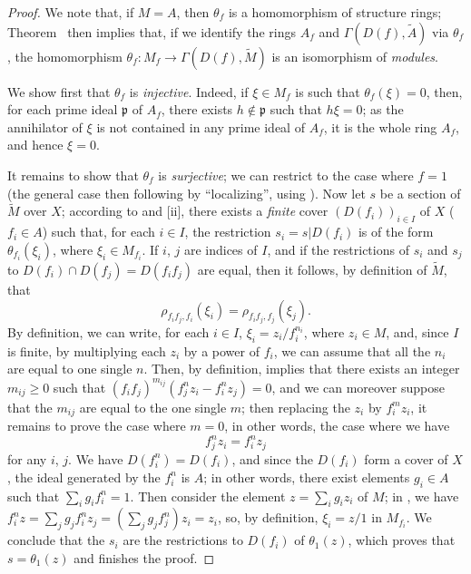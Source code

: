 \begin{proof}
We note that, if $M=A$, then $\theta_f$ is a homomorphism of structure rings;
Theorem~ then implies that, if we identify the rings $A_f$ and $\Gamma(D(f),\widetilde{A})$ via $\theta_f$, the homomorphism $\theta_f:M_f\to\Gamma(D(f),\widetilde{M})$ is an isomorphism of \emph{modules}.

We show first that $\theta_f$ is \emph{injective}.
Indeed, if $\xi\in M_f$ is such that $\theta_f(\xi)=0$, then, for each prime ideal $\mathfrak{p}$ of $A_f$, there exists $h\not\in\mathfrak{p}$ such that $h\xi=0$;
as the annihilator of $\xi$ is not contained in any prime ideal of $A_f$, it is the whole ring $A_f$, and hence $\xi=0$.

It remains to show that $\theta_f$ is \emph{surjective};
we can restrict to the case where $f=1$ (the general case then following by ``localizing'', using ).
Now let $s$ be a section of $\widetilde{M}$ over $X$;
according to  and [ii], there exists a \emph{finite} cover $(D(f_i))_{i\in I}$ of $X$ ($f_i\in A$) such that, for each $i\in I$, the restriction $s_i=s|D(f_i)$ is of the form $\theta_{f_i}(\xi_i)$, where $\xi_i\in M_{f_i}$.
If $i$, $j$ are indices of $I$, and if the restrictions of $s_i$ and $s_j$ to $D(f_i)\cap D(f_j)=D(f_i f_j)$ are equal, then it follows, by definition of $\widetilde{M}$, that
\[
  \label{I.1.3.7.1}
  \rho_{f_i f_j,f_i}(\xi_i)=\rho_{f_i f_j,f_j}(\xi_j).
  \tag{1.3.7.1}
\]
By definition, we can write, for each $i\in I$, $\xi_i=z_i/f_i^{n_i}$, where $z_i\in M$, and, since $I$ is finite, by multiplying each $z_i$ by a power of $f_i$, we can assume that all the $n_i$ are equal to one single $n$.
Then, by definition,  implies that there exists an integer $m_{ij}\geq 0$ such that $(f_i f_j)^{m_{ij}}(f_j^n z_i-f_i^n z_j)=0$, and we can moreover suppose that the $m_{ij}$ are equal to the one single $m$;
then replacing the $z_i$ by $f_i^m z_i$, it remains to prove the case where $m=0$, in other words, the case where we have
\[
  \label{I.1.3.7.2}
  f_j^n z_i=f_i^n z_j
  \tag{1.3.7.2}
\]
for any $i$, $j$.
We have $D(f_i^n)=D(f_i)$, and since the $D(f_i)$ form a cover of $X$, the ideal generated by the $f_i^n$ is $A$;
in other words, there exist elements $g_i\in A$ such that $\sum_i g_i f_i^n=1$.
Then consider the element $z=\sum_i g_i z_i$ of $M$;
in , we have $f_i^n z=\sum_j g_j f_i^n z_j=(\sum_j g_j f_j^n)z_i=z_i$, so, by definition, $\xi_i=z/1$ in $M_{f_i}$.
We conclude
that the $s_i$ are the restrictions to $D(f_i)$ of $\theta_1(z)$, which proves that $s=\theta_1(z)$ and finishes the proof.
\end{proof}


